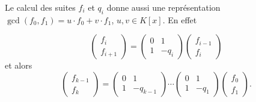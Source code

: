 Le calcul des suites $f_i$ et $q_i$ donne aussi une représentation $\gcd(f_0,f_1) = u ⋅f_0 + v ⋅f_1$, $u,v ∈K[x]$. En effet


\begin{displaymath}
  \begin{pmatrix}
    f_{i} \\  f_{i+1} 
  \end{pmatrix}
  =
  \begin{pmatrix}
    0 & 1 \\
    1 & -q_i
  \end{pmatrix}
  \begin{pmatrix}
     f_{i-1} \\  f_{i}
   \end{pmatrix}
\end{displaymath}
et alors
\begin{displaymath}
  \begin{pmatrix}
    f_{k-1} \\ f_k
  \end{pmatrix} =
  \begin{pmatrix}
    0 & 1 \\
    1 & -q_{k-1}
  \end{pmatrix} \cdots
  \begin{pmatrix}
    0 & 1 \\
    1 & -q_{1}
  \end{pmatrix}
  \begin{pmatrix}
    f_0 \\ f_1
  \end{pmatrix}.
\end{displaymath}
